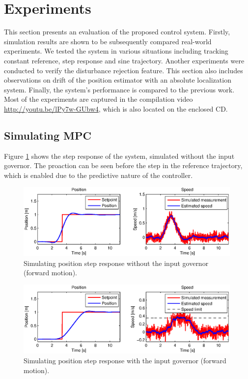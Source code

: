 \section{Experiments}
\label{cap:experiments}

This section presents an evaluation of the proposed control system. Firstly, simulation results are shown to be subsequently compared real-world experiments. We tested the system in various situations including tracking constant reference, step response and sine trajectory. Another experiments were conducted to verify the disturbance rejection feature. This section also includes observations on drift of the position estimator with an absolute localization system. Finally, the system's performance is compared to the previous work. Most of the experiments are captured in the compilation video \url{http://youtu.be/lPy7w-GUbw4}, which is also located on the enclosed CD. 

\subsection{Simulating MPC}

Figure \ref{fig:simulation_step_no_governor} shows the step response of the system, simulated without the input governor. The proaction can be seen before the step in the reference trajectory, which is enabled due to the predictive nature of the controller. 

\begin{figure}[H]
\centering
\includegraphics[width=0.99\textwidth]{fig/simulation1_step_no_governor.eps}
\caption{Simulating position step response without the input governor (forward motion).}
\label{fig:simulation_step_no_governor}
\end{figure}

\begin{figure}[H]
\centering
\includegraphics[width=0.99\textwidth]{fig/simulation2_step_governor.eps}
\caption{Simulating position step response with the input governor (forward motion).}
\label{fig:simulation_step_governor}
\end{figure}

